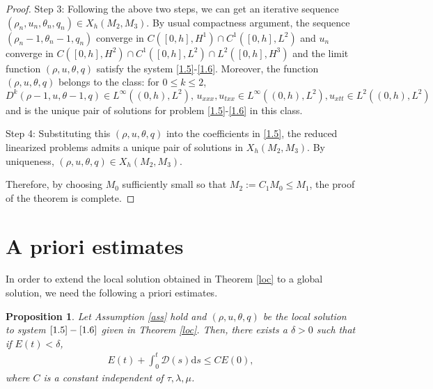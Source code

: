 \documentclass[11pt,reqno]{amsart}
\numberwithin{equation}{section}
\newtheorem{proposition}[theorem]{Proposition}
\newcommand{\dif}{\mathrm{d}}
\begin{document}
\begin{proof}
Step 3: Following the above two steps, we can get an iterative sequence $(\rho_n, u_n, \theta_n, q_n)\in X_h(M_2, M_3)$. By usual compactness
 argument, the sequence$(\rho_n-1, \theta_n-1, q_n)$ converge in $C([0,h], H^1)\cap C^1([0,h], L^2)$ and $u_n$ converge in $C([0,h], H^2)\cap C^1([0,h],L^2)\cap L^2([0,h], H^3)$ and the limit
 function $(\rho, u, \theta, q)$ satisfy the system \eqref{1.5}-\eqref{1.6}. Moreover, the function $(\rho, u, \theta, q)$ belongs to the class: for $0\le k\le 2$,
 \[
 D^k(\rho-1, u, \theta-1, q)\in L^\infty((0,h), L^2),\,  u_{xxx}, u_{txx}\in L^\infty((0,h), L^2), u_{xtt}\in L^2((0,h), L^2)
 \]
 and is the unique pair of solutions for problem \eqref{1.5}-\eqref{1.6} in this class.

Step 4:  Substituting this $(\rho, u, \theta, q)$ into the coefficients in \eqref{1.5}, the reduced linearized problems admits a unique pair of solutions in
 $X_h(M_2,M_3)$. By uniqueness, $(\rho, u, \theta, q) \in X_h(M_2,M_3)$.

  Therefore, by choosing $M_0$ sufficiently small so that $M_2:=C_1 M_0 \le M_1$, the proof of the theorem is complete.

 \end{proof}



 \section{A priori estimates}

In order to extend the local solution obtained in Theorem \ref{loc} to a global solution, we need the following a priori estimates.
\begin{proposition}\label{pro}
Let Assumption \ref{ass} hold and $(\rho, u, \theta, q)$ be the local solution to system $\eqref{1.5}-\eqref{1.6}$ given in Theorem \ref{loc}. Then, there exists a $\delta>0$ such that if $E(t)<\delta$,
\begin{align}\label{hu3.1}
E(t)+\int_0^t \mathcal D(s)\dif s \le C E(0),
\end{align}
where $C$ is a constant independent of $\tau, \lambda, \mu$.
\end{proposition}


%
%
\end{document}
